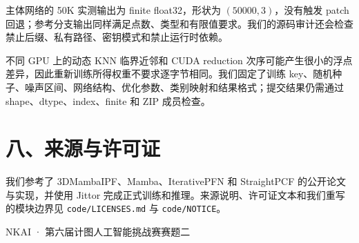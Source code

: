 \documentclass[UTF8,a4paper,11pt,fontset=fandol]{ctexart}
\newcommand{\code}[1]{\nolinkurl{#1}}
\begin{document}
主体网络的 50K 实测输出为 finite float32，形状为 $(50000,3)$，没有触发 patch 回退；参考分支输出同样满足点数、类型和有限值要求。我们的源码审计还会检查禁止后缀、私有路径、密钥模式和禁止运行时依赖。

不同 GPU 上的动态 KNN 临界近邻和 CUDA reduction 次序可能产生很小的浮点差异，因此重新训练所得权重不要求逐字节相同。我们固定了训练 key、随机种子、噪声区间、网络结构、优化参数、类别映射和结果格式；提交结果仍需通过 shape、dtype、index、finite 和 ZIP 成员检查。

\section{八、来源与许可证}

我们参考了 3DMambaIPF、Mamba、IterativePFN 和 StraightPCF 的公开论文与实现，并使用 Jittor 完成正式训练和推理。来源说明、许可证文本和我们重写的模块边界见 \code{code/LICENSES.md} 与 \code{code/NOTICE}。

\vfill
\begin{center}
  \color{NKGray}\small
  NKAI · 第六届计图人工智能挑战赛赛题二
\end{center}
\end{document}
